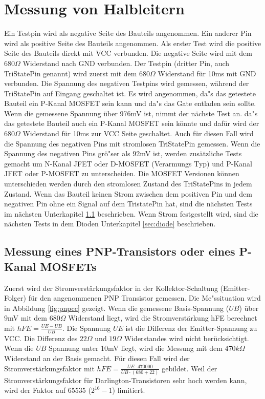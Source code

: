 \section{Messung von Halbleitern}
Ein Testpin wird als negative Seite des Bauteils angenommen.
Ein anderer Pin wird als positive Seite des Bauteils angenommen.
Als erster Test wird die positive Seite des Bauteils direkt mit VCC verbunden.
Die negative Seite wird mit dem \(680\Omega\) Widerstand nach GND verbunden.
Der Testpin (dritter Pin, auch TriStatePin genannt) wird zuerst mit dem \(680\Omega\) Widerstand
f\"ur 10ms mit GND verbunden.
Die Spannung des negativen Testpins wird gemessen, w\"ahrend der TriStatePin auf Eingang
geschaltet ist.
Es wird angenommen, da"s das getestete Bauteil ein P-Kanal MOSFET sein kann und da"s das Gate
entladen sein sollte.
Wenn die gemessene Spannung \"uber 976mV ist, nimmt der n\"achste Test an. da"s das getestete
Bauteil auch ein P-Kanal MOSFET sein k\"onnte und daf\"ur wird der \(680\Omega\) Widerstand
f\"ur 10ms zur VCC Seite geschaltet.
Auch f\"ur diesen Fall wird die Spannung des negativen Pins mit stromlosen TriStatePin gemessen.
Wenn die Spannung des negativen Pins gr\"o"ser als 92mV ist, werden zus\"atzliche Tests gemacht
um N-Kanal JFET oder D-MOSFET (Verarmungs Typ) und P-Kanal JFET oder P-MOSFET zu unterscheiden.
Die MOSFET Versionen k\"onnen unterschieden werden durch den stromlosen Zustand des
TriStatePins in jedem Zustand.
Wenn das Bauteil keinen Strom zwischen dem positiven Pin und dem negativen Pin ohne ein Signal
auf dem TristatePin hat, sind die n\"achsten Tests im n\"achsten Unterkapitel \ref{sec:pnp} beschrieben.
Wenn Strom festgestellt wird, sind die n\"achsten Tests in dem Dioden Unterkapitel \ref{sec:diode} beschrieben.

\subsection{Messung eines PNP-Transistors oder eines P-Kanal MOSFETs}
\label{sec:pnp}
Zuerst wird der Stromverst\"arkungsfaktor in der Kollektor-Schaltung (Emitter-Folger) f\"ur den angenommenen
PNP Transistor gemessen.
Die Me"ssituation wird in Abbildung \ref{fig:pnpcc} gezeigt.
Wenn die gemessene Basis-Spannung (\(UB\)) \"uber 9mV mit dem \(680\Omega\) Widerstand liegt,
wird die Stromverst\"arkung hFE berechnet mit \(hFE = \frac{UE-UB}{UB}\). 
Die Spannung \(UE\) ist die Differenz der Emitter-Spannung zu VCC.
Die Differenz des \(22\Omega\) und \(19\Omega\) Widerstandes wird nicht ber\"ucksichtigt.
Wenn die \(UB\) Spannung unter 10mV liegt, wird die Messung mit dem \(470k\Omega\) Widerstand an der Basis gemacht.
F\"ur diesen Fall wird der Stromverst\"arkungsfaktor mit \(hFE = \frac{UE \cdot 470000}{UB \cdot (680+22)}\) gebildet.
Weil der Stromverst\"arkungsfaktor f\"ur Darlington-Transistoren sehr hoch werden kann, wird der Faktor
auf 65535 (\(2^{16}-1\)) limitiert. 

